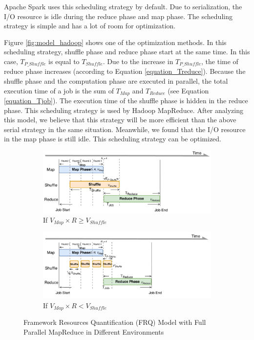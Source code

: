 {Apache Spark uses this scheduling strategy by default. Due to serialization, the I/O resource is idle during the reduce phase and map phase. The scheduling strategy is simple and has a lot of room for optimization.

Figure \ref{fig:model_hadoop} shows one of the optimization methods. In this scheduling strategy, shuffle phase and reduce phase start at the same time. In this case, \(T_{P\_Shuffle}\) is equal to \(T_{Shuffle}\). Due to the increase in \(T_{P\_Shuffle}\), the time of reduce phase increases (according to Equation \ref{equation_Treduce}). Because the shuffle phase and the computation phase are executed in parallel, the total execution time of a job is the sum of \(T_{Map}\) and \(T_{Reduce}\) (see Equation \ref{equation_Tjob}). The execution time of the shuffle phase is hidden in the reduce phase. This scheduling strategy is used by Hadoop MapReduce. After analyzing this model, we believe that this strategy will be more efficient than the above serial strategy in the same situation. Meanwhile, we found that the I/O resource in the map phase is still idle. This scheduling strategy can be optimized.

\begin{figure}
	\centering
	\begin{subfigure}{0.47\linewidth}
		\includegraphics[width=\linewidth]{fig/model_scache1}
		\caption{\color{blue}If \(V_{Map} \times R \ge V_{Shuffle}\)}
		\label{fig:model_scache1}
	\end{subfigure}
	\begin{subfigure}{0.47\linewidth}
		\includegraphics[width=\linewidth]{fig/model_scache2}
		\caption{\color{blue}If \(V_{Map} \times R < V_{Shuffle}\)}
		\label{fig:model_scache2}
	\end{subfigure}
	\caption{\color{blue}Framework Resources Quantification (FRQ) Model with Full Parallel MapReduce in Different Environments}
	\label{fig:model_scache}
\end{figure}

}
